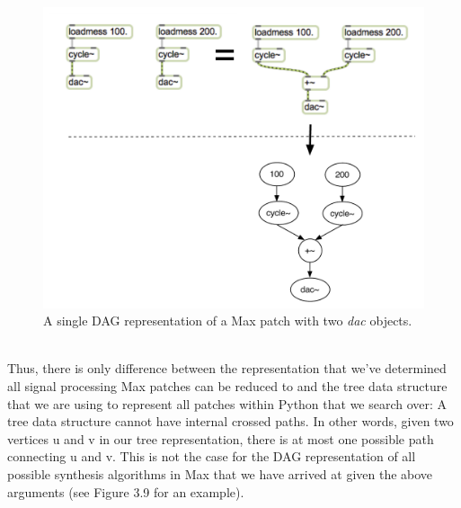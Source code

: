 \documentclass[a4paper,12pt]{report} 	%
\numberwithin{figure}{chapter}
\numberwithin{table}{chapter}
\numberwithin{equation}{chapter}
\begin{document}
\begin{flushleft}
\begin{figure}[h!]
\begin{center}
\includegraphics[scale=0.7]{MaxDAGs2DACs}
\caption[A Single DAG with Two \emph{dac\texttildelow{}} Objects]{A single DAG representation of a Max patch with two \emph{dac\texttildelow{}} objects.}
\end{center}
\end{figure}
\\
Thus, there is only difference between the representation that we've determined all signal processing Max patches can be reduced to and the tree data structure that we are using to represent all patches within Python that we search over: A tree data structure cannot have internal crossed paths. In other words, given two vertices u and v in our tree representation, there is at most one possible path connecting u and v. This is not the case for the DAG representation of all possible synthesis algorithms in Max that we have arrived at given the above arguments (see Figure 3.9 for an example).
\begin{figure}[h!]
\begin{center}

\end{center}
\end{figure}
\end{flushleft}
\end{document}
